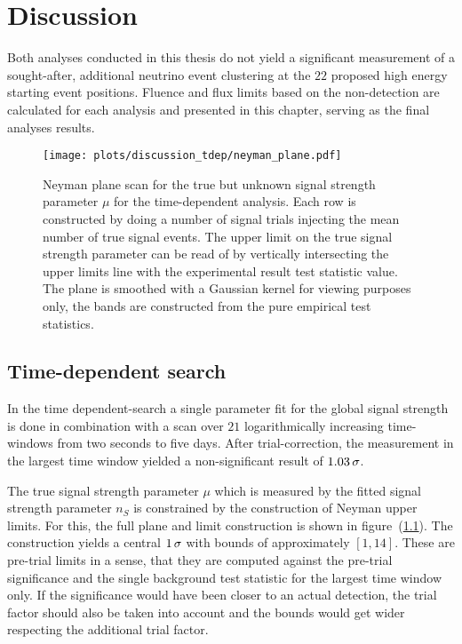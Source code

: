 \chapter{Discussion}

Both analyses conducted in this thesis do not yield a significant measurement of a sought-after, additional neutrino event clustering at the $\num{22}$ proposed high energy starting event positions.
Fluence and flux limits based on the non-detection are calculated for each analysis and presented in this chapter, serving as the final analyses results.

\begin{figure}[htpb]
  \centering
  \texttt{[image: plots/discussion\_tdep/neyman\_plane.pdf]}
  \caption[Neyman plane for the signal strength parameter in the time-dependent analysis]{
    Neyman plane scan for the true but unknown signal strength parameter $\mu$ for the time-dependent analysis.
    Each row is constructed by doing a number of signal trials injecting the mean number of true signal events.
    The upper limit on the true signal strength parameter can be read of by vertically intersecting the upper limits line with the experimental result test statistic value.
    The plane is smoothed with a Gaussian kernel for viewing purposes only, the bands are constructed from the pure empirical test statistics.
  }
  \label{fig:tdep_neyman_plane}
\end{figure}

\section*{Time-dependent search}
In the time dependent-search a single parameter fit for the global signal strength is done in combination with a scan over $\num{21}$ logarithmically increasing time-windows from two seconds to five days.
After trial-correction, the measurement in the largest time window yielded a non-significant result of $\num{1.03}\,\sigma$.

The true signal strength parameter $\mu$ which is measured by the fitted signal strength parameter $n_S$ is constrained by the construction of Neyman upper limits.
For this, the full plane and limit construction is shown in figure~(\ref{fig:tdep_neyman_plane}).
The construction yields a central $\num{1}\,\sigma$ with bounds of approximately $[1, 14]$.
These are pre-trial limits in a sense, that they are computed against the pre-trial significance and the single background test statistic for the largest time window only.
If the significance would have been closer to an actual detection, the trial factor should also be taken into account and the bounds would get wider respecting the additional trial factor.

